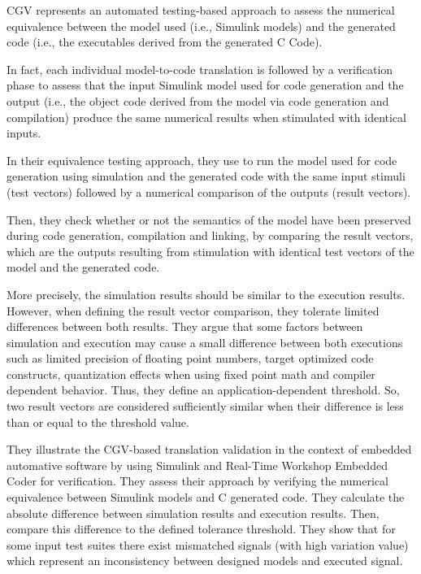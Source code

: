 CGV represents an automated testing-based approach to assess the numerical equivalence between the model used (i.e., Simulink models) and the generated code (i.e., the executables derived from the generated C Code). 

In fact, each individual model-to-code translation is followed by a verification phase to assess that the input Simulink model used for code generation and the output (i.e., the object code derived from the model via code generation and compilation) produce the same numerical results when stimulated with identical inputs. 

In their equivalence testing approach, they use to run the model used for code generation using simulation and the generated code with the same input stimuli (test vectors) followed by a numerical comparison of the outputs (result vectors).

Then, they check whether or not the semantics of the model have been preserved during code generation, compilation and linking, by comparing the result vectors, which are the outputs resulting from stimulation with identical test vectors of the model and the generated code.

More precisely, the simulation results should be similar to the execution results. However, when defining the result vector comparison, they tolerate limited differences between both results. They argue that some factors between simulation and execution may cause a small difference between both executions such as limited precision of floating point numbers, target optimized code constructs, quantization effects when using fixed point math and compiler dependent behavior. 
Thus, they define an application-dependent threshold. So, two result vectors are considered sufficiently similar when their difference is less than or equal to the threshold value.

They illustrate the CGV-based translation validation in the context of embedded automative software by using Simulink and Real-Time Workshop Embedded Coder for verification. They assess their approach by verifying the numerical equivalence between Simulink models and C generated code. They calculate the absolute difference between simulation results and execution results. Then, compare this difference to the defined tolerance threshold. They show that for some input test suites there exist mismatched signals (with high variation value) which represent an inconsistency between designed models and executed signal.








